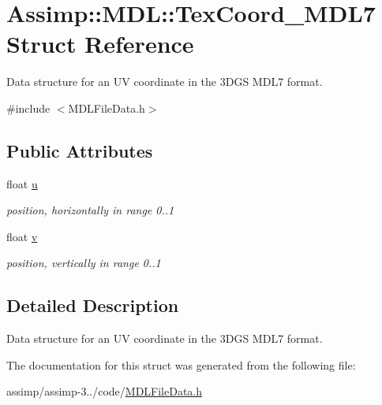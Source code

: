 \hypertarget{struct_assimp_1_1_m_d_l_1_1_tex_coord___m_d_l7}{\section{Assimp\+:\+:M\+D\+L\+:\+:Tex\+Coord\+\_\+\+M\+D\+L7 Struct Reference}
\label{struct_assimp_1_1_m_d_l_1_1_tex_coord___m_d_l7}
}


Data structure for an U\+V coordinate in the 3\+D\+G\+S M\+D\+L7 format.  




{\ttfamily \#include $<$M\+D\+L\+File\+Data.\+h$>$}

\subsection*{Public Attributes}
\begin{DoxyCompactItemize}
\item 
\hypertarget{struct_assimp_1_1_m_d_l_1_1_tex_coord___m_d_l7_a16e443ada4fbe2711c426f8f279f4514}{float \hyperlink{struct_assimp_1_1_m_d_l_1_1_tex_coord___m_d_l7_a16e443ada4fbe2711c426f8f279f4514}{u}}\label{struct_assimp_1_1_m_d_l_1_1_tex_coord___m_d_l7_a16e443ada4fbe2711c426f8f279f4514}

\begin{DoxyCompactList}\small\item\em position, horizontally in range 0..1 \end{DoxyCompactList}\item 
\hypertarget{struct_assimp_1_1_m_d_l_1_1_tex_coord___m_d_l7_a6090967a4cd20e777e0e8057bcdf5783}{float \hyperlink{struct_assimp_1_1_m_d_l_1_1_tex_coord___m_d_l7_a6090967a4cd20e777e0e8057bcdf5783}{v}}\label{struct_assimp_1_1_m_d_l_1_1_tex_coord___m_d_l7_a6090967a4cd20e777e0e8057bcdf5783}

\begin{DoxyCompactList}\small\item\em position, vertically in range 0..1 \end{DoxyCompactList}\end{DoxyCompactItemize}


\subsection{Detailed Description}
Data structure for an U\+V coordinate in the 3\+D\+G\+S M\+D\+L7 format. 

The documentation for this struct was generated from the following file\+:\begin{DoxyCompactItemize}
\item 
assimp/assimp-\/3../code/\hyperlink{_m_d_l_file_data_8h}{M\+D\+L\+File\+Data.\+h}\end{DoxyCompactItemize}
